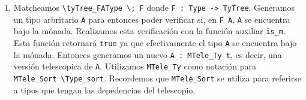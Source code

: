 \begin{enumerate}
    \item Matcheamos \lstinline{\tyTree_FAType \; F} donde \lstinline{F : Type -> TyTree}. Generamos un tipo arbritario \lstinline{A} para entonces poder verificar si, en \lstinline{F A}, \lstinline{A} se encuentra bajo la mónada. Realizamos esta verificación con la función auxiliar \lstinline{is_m}. Esta función retornará \lstinline{true} ya que efectivamente el tipo \lstinline{A} se encuentra bajo la mónada. Entonces generamos un nuevo \lstinline{A : MTele_Ty t}, es decir, una versión telescopica de \lstinline{A}. Utilizamos \lstinline{MTele_Ty} como notación para \lstinline{MTele_Sort \Type_sort}. Recordemos que \lstinline{MTele_Sort} se utiliza para referirse a tipos que tengan las depedencias del telescopio.
    

\end{enumerate}
